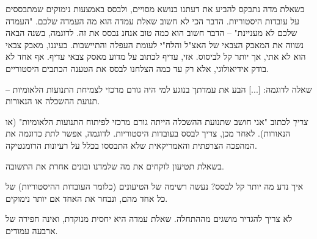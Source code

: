 \documentclass[]{article}
\begin{document}
	בשאלת מדה נתבקס להביע את דעתנו בנושא מסויים, ולבסס באמצעות נימוקים שמתבססים על עובדות היסטוריות. הדבר הכי לא חשוב שאלת עמדה הוא מה העמדה שלכם. "העמדה שלכם לא מעניינת" – הדבר חשוב הוא כמה טוב אנחנ נבסס את זה. לדוגמה, בשנה הבאה נשווה את המאבק הצבאי של האצ"ל והלח"י לעומת העפלה והתיישבות. בעיננו, מאבק צבאי הוא לא אתי, אך יותר קל לביסוס. אזי, עדיף לכתוב על מדוע מאסק צבאי עדיף. אף אחד לא בודק אידיאולוגי, אלא רק עד כמה הצלחנו לבסס את הטענה הכתבים היסטוריים. 
	
	שאלה לדוגמה: [...] הבע את עמדתך בנוגע למי היה גורם מרכזי לצמיחת התנועות הלאומיות – תנועת ההשכלה או הנאורות. 
	
	\textit{צריך} לכתוב "אני חושב שתנועת ההשכלה הייתה גורם מרכזי לפיתוח התנועות הלאומיות" (או הנאורות). לאחר מכן, צריך לבסס בעובדות היסטוריות. לדוגמה, אפשר לתת כדוגמה את המהפכה הצרפתית והאמריקאית שלא התבססו בכלל על רעיונות הרומנטיקה. 
	
	בשאלת תטיעון לוקחים את מה שלמדנו ובונים אחרת את התשובה. 
	
	איך נדע מה יותר קל לבסס? נעשה רשימה של הטיעונים (כלומר העובדות ההיסטוריות) של כל אחד מהם, ונבחר את האחד אם יותר נימוקים. 
	
	לא צריך להגדיר מושגים מההתחלה. שאלת עמדה היא יחסית מנוקדת, ואינה חפירה של ארבעה עמודים. 
	
\end{document}
